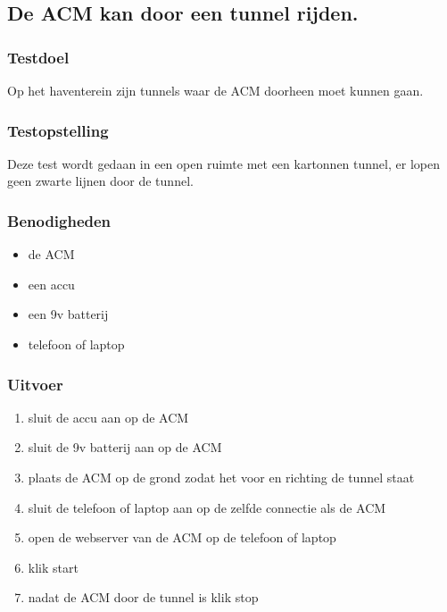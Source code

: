\subsection{De ACM kan door een tunnel rijden.}
\subsubsection{Testdoel}
\begin{flushleft}
    Op het haventerein zijn tunnels waar de ACM doorheen moet kunnen gaan.
\end{flushleft}
\subsubsection{Testopstelling}
\begin{flushleft}
    Deze test wordt gedaan in een open ruimte met een kartonnen tunnel, er lopen geen zwarte lijnen door de tunnel.
\end{flushleft}

\subsubsection{Benodigheden}

\begin{itemize}
    \item de ACM
    \item een accu
    \item een 9v batterij
    \item telefoon of laptop
\end{itemize}


\subsubsection{Uitvoer}

\begin{enumerate}
    \item sluit de accu aan op de ACM
    \item sluit de 9v batterij aan op de ACM
    \item plaats de ACM op de grond zodat het voor en richting de tunnel staat
    \item sluit de telefoon of laptop aan op de zelfde connectie als de ACM
    \item open de webserver van de ACM op de telefoon of laptop
    \item klik start
    \item nadat de ACM door de tunnel is klik stop
\end{enumerate}

